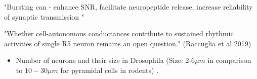 \documentclass[../main.tex]{subfiles}
\begin{document}

\noindent\hrulefill

\noindent\hrulefill

"Bursting can - enhance SNR, facilitate neuropeptide release,
increase reliability of synaptic transmission \cite{vickstromTTypeCalciumChannels2020}
"

"Whether cell-autonomous conductances contribute to sustained rhythmic activities of single R5 neuron remains an open question."
\cite{raccugliaNetworkSpecificSynchronizationElectrical2019} (Raccuglia et al 2019)


\begin{itemize}
    \item Number of neurons and their size in Drosophila (Size: 2-6$\mu m$ in 
    comparison to $10-30\mu m$ for pyramidal cells in rodents) \cite{tuthillLessonsCompartmentalModel2009}.
\end{itemize}
\end{document}
